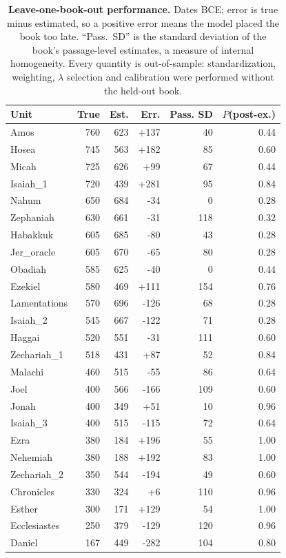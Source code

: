 \begin{table}[!ht]
\centering
\footnotesize
\caption{\textbf{Leave-one-book-out performance.}  Dates BCE; error is true minus estimated, so a positive error means the model placed the book too late. ``Pass.\ SD'' is the standard deviation of the book's passage-level estimates, a measure of internal homogeneity.  Every quantity is out-of-sample: standardization, weighting, $\lambda$ selection and calibration were performed without the held-out book.}
\label{tab:lobo}
\begin{tabular}{lrrrrr}
\toprule
\textbf{Unit} & \textbf{True} & \textbf{Est.} & \textbf{Err.} & \textbf{Pass. SD} & \textbf{$P$(post-ex.)} \\
\midrule
Amos & 760 & 623 & +137 & 40 & 0.44 \\
Hosea & 745 & 563 & +182 & 85 & 0.60 \\
Micah & 725 & 626 & +99 & 67 & 0.44 \\
Isaiah\_1 & 720 & 439 & +281 & 95 & 0.84 \\
Nahum & 650 & 684 & -34 & 0 & 0.28 \\
Zephaniah & 630 & 661 & -31 & 118 & 0.32 \\
Habakkuk & 605 & 685 & -80 & 43 & 0.28 \\
Jer\_oracle & 605 & 670 & -65 & 80 & 0.28 \\
Obadiah & 585 & 625 & -40 & 0 & 0.44 \\
Ezekiel & 580 & 469 & +111 & 154 & 0.76 \\
Lamentations & 570 & 696 & -126 & 68 & 0.28 \\
Isaiah\_2 & 545 & 667 & -122 & 71 & 0.28 \\
Haggai & 520 & 551 & -31 & 111 & 0.60 \\
Zechariah\_1 & 518 & 431 & +87 & 52 & 0.84 \\
Malachi & 460 & 515 & -55 & 86 & 0.64 \\
Joel & 400 & 566 & -166 & 109 & 0.60 \\
Jonah & 400 & 349 & +51 & 10 & 0.96 \\
Isaiah\_3 & 400 & 515 & -115 & 72 & 0.64 \\
Ezra & 380 & 184 & +196 & 55 & 1.00 \\
Nehemiah & 380 & 188 & +192 & 83 & 1.00 \\
Zechariah\_2 & 350 & 544 & -194 & 49 & 0.60 \\
Chronicles & 330 & 324 & +6 & 110 & 0.96 \\
Esther & 300 & 171 & +129 & 54 & 1.00 \\
Ecclesiastes & 250 & 379 & -129 & 120 & 0.96 \\
Daniel & 167 & 449 & -282 & 104 & 0.80 \\
\bottomrule
\end{tabular}
\end{table}
